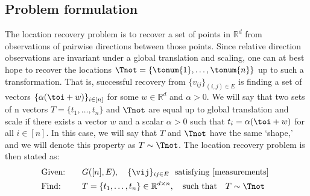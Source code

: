 \subsection{Problem formulation}
The location recovery problem is to recover a set of points in $\mathbb{R}^d$ from observations of pairwise directions between those points.  
Since relative direction observations are invariant under a global translation and scaling, one can at best hope to recover the locations $\Tnot = \{ \tonum{1},\ldots, \tonum{n}\}$ up to such a transformation. That is, successful recovery from $\{v_{ij}\}_{(i,j) \in E}$ is finding a set of vectors ${\{\alpha(\toi + w)\}_{i \in [n]}}$ for some $w \in \mathbb{R}^d$ and $\alpha >0$. We will say that two sets of n vectors $T = \{t_1,\ldots,t_n\}$ and $\Tnot$ are equal up to global translation and scale if there exists a vector $w$ and a scalar $\alpha >0 $ such that $t_i = \alpha(\toi + w)$ for all $i \in [n]$.  In this case, we will say that $T$ and $\Tnot$ have the same `shape,' and we will denote this property as $T \sim \Tnot$. The location recovery problem is then stated as:
\begin{alignat}{2}
&\text{Given:} &\quad &G([n],E), \quad \{\vij\}_{ij \in E} \text{\ \  satisfying \eqref{measurements} }\notag\\
&\text{Find:} && T = \{t_1, \ldots, t_n \} \in \mathbb{R}^{d \times n}, \quad \text{such that} \quad T \sim \Tnot %
\end{alignat}


